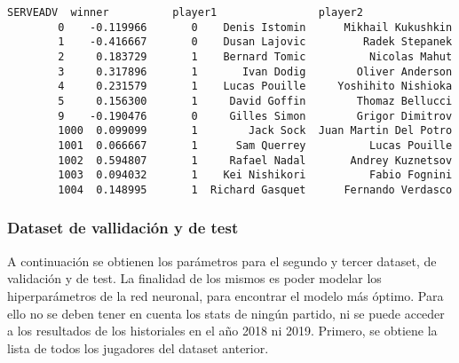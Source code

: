 \documentclass[11pt]{article}
\begin{document}
\begin{Verbatim}[commandchars=\\\{\}]
              SERVEADV  winner          player1                player2  
        0    -0.119966       0    Denis Istomin      Mikhail Kukushkin  
        1    -0.416667       0    Dusan Lajovic         Radek Stepanek  
        2     0.183729       1    Bernard Tomic          Nicolas Mahut  
        3     0.317896       1       Ivan Dodig        Oliver Anderson  
        4     0.231579       1    Lucas Pouille     Yoshihito Nishioka  
        5     0.156300       1     David Goffin        Thomaz Bellucci  
        9    -0.190476       0     Gilles Simon        Grigor Dimitrov  
        1000  0.099099       1        Jack Sock  Juan Martin Del Potro  
        1001  0.066667       1      Sam Querrey          Lucas Pouille  
        1002  0.594807       1     Rafael Nadal       Andrey Kuznetsov  
        1003  0.094032       1    Kei Nishikori          Fabio Fognini  
        1004  0.148995       1  Richard Gasquet      Fernando Verdasco  
\end{Verbatim}
            
    \subsubsection{Dataset de vallidación y de
test}\label{dataset-de-vallidaciuxf3n-y-de-test}

A continuación se obtienen los parámetros para el segundo y tercer
dataset, de validación y de test. La finalidad de los mismos es poder
modelar los hiperparámetros de la red neuronal, para encontrar el modelo
más óptimo. Para ello no se deben tener en cuenta los stats de ningún
partido, ni se puede acceder a los resultados de los historiales en el
año 2018 ni 2019. Primero, se obtiene la lista de todos los jugadores
del dataset anterior.
\end{document}
